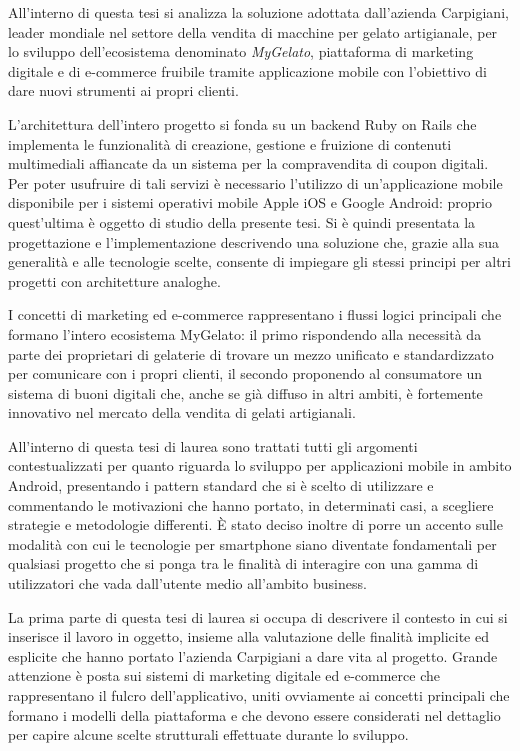 \medskip{}

All'interno di questa tesi si analizza la soluzione adottata dall'azienda
Carpigiani, leader mondiale nel settore della vendita di macchine
per gelato artigianale, per lo sviluppo dell'ecosistema denominato
\emph{MyGelato}, piattaforma di marketing digitale e di e-commerce
fruibile tramite applicazione mobile con l’obiettivo di dare nuovi
strumenti ai propri clienti.

\medskip{}

L’architettura dell'intero progetto si fonda su un backend Ruby on
Rails che implementa le funzionalità di creazione, gestione e fruizione
di contenuti multimediali affiancate da un sistema per la compravendita
di coupon digitali. Per poter usufruire di tali servizi è necessario
l’utilizzo di un’applicazione mobile disponibile per i sistemi operativi
mobile Apple iOS e Google Android: proprio quest'ultima è oggetto
di studio della presente tesi. Si è quindi presentata la progettazione
e l’implementazione descrivendo una soluzione che, grazie alla sua
generalità e alle tecnologie scelte, consente di impiegare gli stessi
principi per altri progetti con architetture analoghe.

\medskip{}

I concetti di marketing ed e-commerce rappresentano i flussi logici
principali che formano l’intero ecosistema MyGelato: il primo rispondendo
alla necessità da parte dei proprietari di gelaterie di trovare un
mezzo unificato e standardizzato per comunicare con i propri clienti,
il secondo proponendo al consumatore un sistema di buoni digitali
che, anche se già diffuso in altri ambiti, è fortemente innovativo
nel mercato della vendita di gelati artigianali.

\medskip{}

All'interno di questa tesi di laurea sono trattati tutti gli argomenti
contestualizzati per quanto riguarda lo sviluppo per applicazioni
mobile in ambito Android, presentando i pattern standard che si è
scelto di utilizzare e commentando le motivazioni che hanno portato,
in determinati casi, a scegliere strategie e metodologie differenti.
È stato deciso inoltre di porre un accento sulle modalità con cui
le tecnologie per smartphone siano diventate fondamentali per qualsiasi
progetto che si ponga tra le finalità di interagire con una gamma
di utilizzatori che vada dall'utente medio all'ambito business.

\medskip{}
La prima parte di questa tesi di laurea si occupa di descrivere il
contesto in cui si inserisce il lavoro in oggetto, insieme alla valutazione
delle finalità implicite ed esplicite che hanno portato l’azienda
Carpigiani a dare vita al progetto. Grande attenzione è posta sui
sistemi di marketing digitale ed e-commerce che rappresentano il fulcro
dell'applicativo, uniti ovviamente ai concetti principali che formano
i modelli della piattaforma e che devono essere considerati nel dettaglio
per capire alcune scelte strutturali effettuate durante lo sviluppo.

